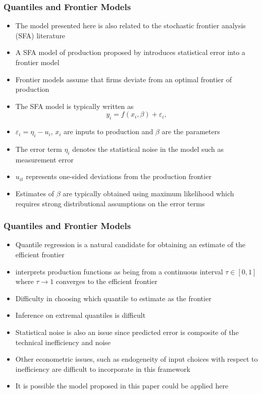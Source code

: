 \documentclass[xcolor={dvipsnames}, notheorems]{beamer}
\theoremstyle{plain}
\begin{document}

\begin{frame}
\frametitle{Quantiles and Frontier Models}
\begin{itemize}
\item The model presented here is also related to the stochastic frontier analysis (SFA) literature
\item A SFA model of production proposed by \cite{Aigner1977} introduces statistical error into a frontier model
\item Frontier models assume that firms deviate from an optimal frontier of production
\item The SFA model is typically written as
\begin{equation}
y_{i}=f(x_{i}, \beta)+\varepsilon_{i},
\end{equation}
\item $\varepsilon_{i}=\eta_{i}-u_{i}$, $x_{i}$ are inputs to production and $\beta$ are the parameters
\item The error term $\eta_{i}$ denotes the statistical noise in the model such as measurement error
\item $u_{it}$ represents one-sided deviations from the production frontier
\item Estimates of $\beta$ are typically obtained using maximum likelihood which requires strong distributional assumptions on the error terms
\end{itemize}
\end{frame}


\begin{frame}
\frametitle{Quantiles and Frontier Models}
\begin{itemize}
\item Quantile regression is a natural candidate for obtaining an estimate of the efficient frontier
\item \cite{Aragon2005} interprets production functions as being from a continuous interval $\tau\in[0,1]$ where $\tau\rightarrow 1$ converges to the efficient frontier
\item Difficulty in choosing which quantile to estimate as the frontier
\item Inference on extremal quantiles is difficult \citep{Chernozhukov2005a}
\item Statistical noise is also an issue since predicted error is composite of the technical inefficiency and noise
\item Other econometric issues, such as endogeneity of input choices with respect to inefficiency are difficult to incorporate in this framework
\item It is possible the model proposed in this paper could be applied here
\end{itemize}
\end{frame}
\end{document}
